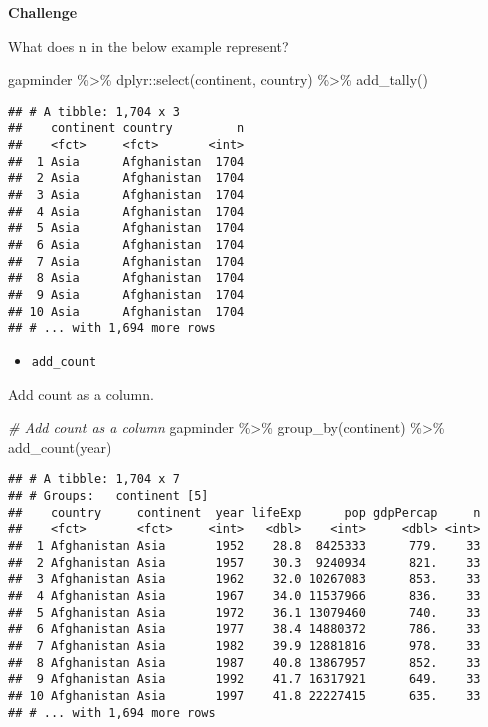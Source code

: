 \documentclass[
]{book}
\newenvironment{Shaded}{\begin{snugshade}}{\end{snugshade}}
\newcommand{\CommentTok}[1]{\textcolor[rgb]{0.56,0.35,0.01}{\textit{#1}}}
\newcommand{\FunctionTok}[1]{\textcolor[rgb]{0.00,0.00,0.00}{#1}}
\newcommand{\NormalTok}[1]{#1}
\newcommand{\SpecialCharTok}[1]{\textcolor[rgb]{0.00,0.00,0.00}{#1}}
\providecommand{\tightlist}{%
  \setlength{\itemsep}{0pt}\setlength{\parskip}{0pt}}
\begin{document}
\textbf{Challenge}

What does n in the below example represent?

\begin{Shaded}
\begin{Highlighting}[]
\NormalTok{gapminder }\SpecialCharTok{\%\textgreater{}\%}
\NormalTok{  dplyr}\SpecialCharTok{::}\FunctionTok{select}\NormalTok{(continent, country) }\SpecialCharTok{\%\textgreater{}\%}
  \FunctionTok{add\_tally}\NormalTok{()}
\end{Highlighting}
\end{Shaded}

\begin{verbatim}
## # A tibble: 1,704 x 3
##    continent country         n
##    <fct>     <fct>       <int>
##  1 Asia      Afghanistan  1704
##  2 Asia      Afghanistan  1704
##  3 Asia      Afghanistan  1704
##  4 Asia      Afghanistan  1704
##  5 Asia      Afghanistan  1704
##  6 Asia      Afghanistan  1704
##  7 Asia      Afghanistan  1704
##  8 Asia      Afghanistan  1704
##  9 Asia      Afghanistan  1704
## 10 Asia      Afghanistan  1704
## # ... with 1,694 more rows
\end{verbatim}

\begin{itemize}
\tightlist
\item
  \texttt{add\_count}
\end{itemize}

Add count as a column.

\begin{Shaded}
\begin{Highlighting}[]
\CommentTok{\# Add count as a column}
\NormalTok{gapminder }\SpecialCharTok{\%\textgreater{}\%}
  \FunctionTok{group\_by}\NormalTok{(continent) }\SpecialCharTok{\%\textgreater{}\%}
  \FunctionTok{add\_count}\NormalTok{(year)}
\end{Highlighting}
\end{Shaded}

\begin{verbatim}
## # A tibble: 1,704 x 7
## # Groups:   continent [5]
##    country     continent  year lifeExp      pop gdpPercap     n
##    <fct>       <fct>     <int>   <dbl>    <int>     <dbl> <int>
##  1 Afghanistan Asia       1952    28.8  8425333      779.    33
##  2 Afghanistan Asia       1957    30.3  9240934      821.    33
##  3 Afghanistan Asia       1962    32.0 10267083      853.    33
##  4 Afghanistan Asia       1967    34.0 11537966      836.    33
##  5 Afghanistan Asia       1972    36.1 13079460      740.    33
##  6 Afghanistan Asia       1977    38.4 14880372      786.    33
##  7 Afghanistan Asia       1982    39.9 12881816      978.    33
##  8 Afghanistan Asia       1987    40.8 13867957      852.    33
##  9 Afghanistan Asia       1992    41.7 16317921      649.    33
## 10 Afghanistan Asia       1997    41.8 22227415      635.    33
## # ... with 1,694 more rows
\end{verbatim}
\end{document}
